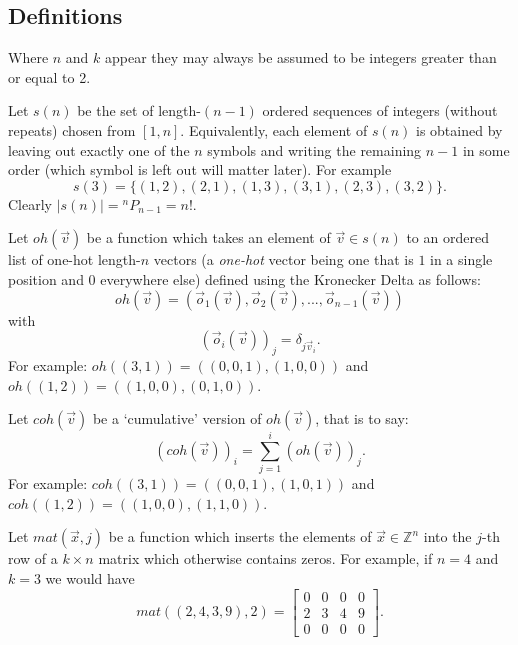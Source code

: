 \subsection{Definitions}
\label{sec:defs}
Where $n$ and $k$ appear they may always be assumed to be integers  greater than or equal to 2.

\label{def:sn}Let $s(n)$ be the set of length-$(n-1)$ ordered sequences of integers (without repeats) chosen from $[1,n]$.  Equivalently, each element of $s(n)$ is obtained by leaving out exactly one of the $n$ symbols and writing the remaining $n-1$ in some order (which symbol is left out will matter later).  For example $$s(3)=\{(1,2),(2,1),(1,3),(3,1),(2,3),(3,2)\}.$$
Clearly
$|s(n)| = {}^n P_{n-1} = n!.$

\label{def:oh}Let $oh(\vec v)$ be a function which takes an element of $\vec v\in s(n)$ to an ordered list of one-hot length-$n$ vectors (a \emph{one-hot} vector being one that is $1$ in a single position and $0$ everywhere else) defined using the Kronecker Delta as follows:
$$oh(\vec v) = (\vec o_1(\vec v), \vec o_2(\vec v), ..., \vec o_{n-1}(\vec v)) $$
with
$$(\vec o_i(\vec v))_j= \delta_{j \vec v_i}.$$
For example:
$oh((3,1)) = ( (0,0,1), (1,0,0))$
and
$oh((1,2)) = ( (1,0,0), (0,1,0))$.



\label{def:coh}Let $coh(\vec v)$ be a `cumulative' version of $oh(\vec v)$, that is to say:
$$(coh(\vec v))_i = \sum_{j=1}^i (oh(\vec v))_j.$$
For example: $coh((3,1)) = ( (0,0,1), (1,0,1))$
and
$coh((1,2)) = ( (1,0,0), (1,1,0))$.


\label{def:mat}Let $mat(\vec x,j)$ be a function which inserts the elements of $\vec x\in \mathbb Z^n$ into the $j$-th row of a $k \times n$ matrix which otherwise contains zeros.
    For example, if $n=4$ and $k=3$ we would have $$mat((2,4,3,9),2) = \begin{bmatrix} 0 & 0 & 0 & 0 \\ 2 & 3 & 4 & 9 \\ 0 & 0 &0 &0\end{bmatrix}.$$


